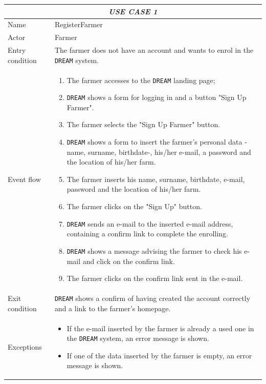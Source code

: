 \documentclass{article}
\begin{document}
\centering
\begin{longtable}{|p{3.5cm}|m{8cm}|}
 \hline
 \multicolumn{2}{|c|}{\cellcolor{white}\emph{USE CASE 1}} \\
 \endfirsthead
 \endhead
 \endfoot
 \endlastfoot
 \hline
 Name & RegisterFarmer\\
 \hline
 Actor & Farmer\\
 \hline
 Entry condition & The farmer does not have an account and wants to enrol in the \verb|DREAM| system.\\
 \hline
 Event flow & \begin{enumerate}
    \item The farmer accesses to the \verb|DREAM| landing page;
    \item \verb|DREAM| shows a form for logging in and a button "Sign Up Farmer".
    \item The farmer selects the "Sign Up Farmer" button.
    \item \verb|DREAM| shows a form to insert the farmer's personal data -name, surname, birthdate-, his/her e-mail, a password and the location of his/her farm.
    \item The farmer inserts his name, surname, birthdate, e-mail, password and the location of his/her farm.
    \item The farmer clicks on the "Sign Up" button.
    \item \verb|DREAM| sends an e-mail to the inserted e-mail address, containing a confirm link to complete the enrolling.
    \item \verb|DREAM| shows a message advising the farmer to check his e-mail and click on the confirm link. 
    \item The farmer clicks on the confirm link sent in the e-mail.
 \end{enumerate}\\
 \hline
 Exit condition & \verb|DREAM| shows a confirm of having created the account correctly and a link to the farmer's homepage.\\
 \hline
 Exceptions & \begin{itemize}
     \item If the e-mail inserted by the farmer is already a used one in the \verb|DREAM| system, an error message is shown.
     \item If one of the data inserted by the farmer is empty, an error message is shown.

\end{itemize}
\end{longtable}
\end{document}
